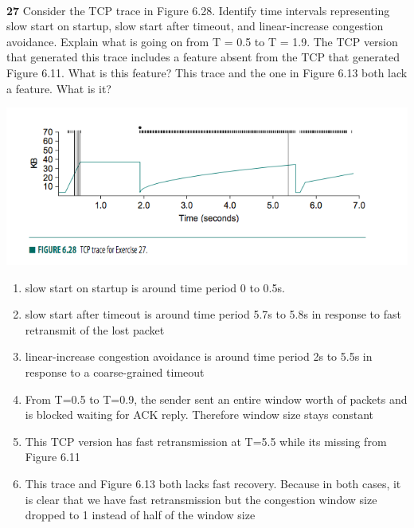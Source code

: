 \documentclass[11pt]{article}
\begin{document}
$ $\\
\textbf{27} Consider the TCP trace in Figure 6.28. Identify time intervals representing slow start on startup, slow start after timeout, and linear-increase congestion avoidance. Explain what is going on from T = 0.5 to T = 1.9. The TCP version that generated this trace includes a feature absent from the TCP that generated Figure 6.11. What is this feature? This trace and the one in Figure 6.13 both lack a feature. What is it? 

\includegraphics[width=\textwidth]{tcptrace.png}

\begin{solution}
    \begin{enumerate}
        \item slow start on startup is around time period 0 to 0.5s. 
        \item slow start after timeout is around time period 5.7s to 5.8s in response to fast retransmit of the lost packet
        \item linear-increase congestion avoidance is around time period 2s to 5.5s in response to a coarse-grained timeout
        \item From T=0.5 to T=0.9, the sender sent an entire window worth of packets and is blocked waiting for ACK reply. Therefore window size stays constant
        \item This TCP version has fast retransmission at T=5.5 while its missing from Figure 6.11
        \item This trace and Figure 6.13 both lacks fast recovery. Because in both cases, it is clear that we have fast retransmission but the congestion window size dropped to 1 instead of half of the window size
    \end{enumerate}
\end{solution}
\end{document}
